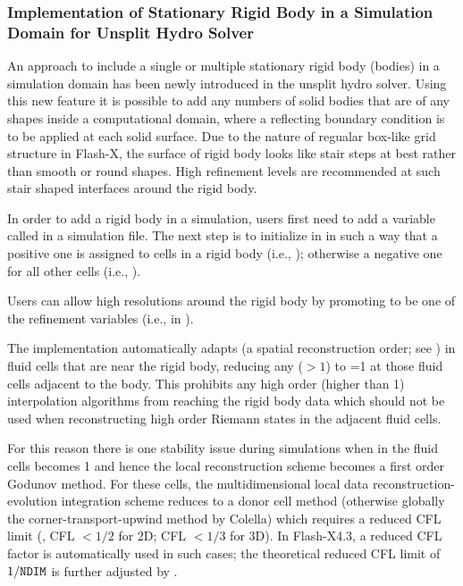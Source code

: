\subsubsection{Implementation of Stationary Rigid Body in a Simulation Domain for Unsplit Hydro Solver}
\label{Sec:StationaryRigidBody}
An approach to include a single or multiple stationary rigid body (bodies) in a simulation domain has 
been newly introduced in the unsplit hydro solver. Using this new feature it is possible to add any 
numbers of solid bodies that are of any shapes inside a computational domain, where a reflecting 
boundary condition is to be applied at each solid surface. Due to the nature of regualar box-like 
grid structure in Flash-X, the surface of rigid body looks like stair steps at best rather than smooth 
or round shapes. High refinement levels are recommended at such stair shaped interfaces around the rigid body. 

In order to add a rigid body in a simulation, users first need to add a variable called  
in a simulation  file. The next step is to initialize  in  
in such a way that a positive one is assigned to cells in a rigid body (i.e.,  ); 
otherwise a negative one for all other cells (i.e., ).

Users can allow high resolutions around the rigid body by promoting  to be one of the refinement variables (i.e.,
 in ).

The implementation automatically adapts  (a spatial reconstruction order; see ) in fluid cells 
that are near the rigid body, reducing
any  ($> 1$) to =1 at those fluid cells adjacent to the body. This prohibits any high order 
(higher than 1) interpolation algorithms from reaching the rigid body data which should not be used 
when reconstructing high order Riemann states in the adjacent fluid cells.
 
For this reason there is one stability issue during simulations when  in the fluid cells 
becomes 1 and hence the local reconstruction scheme becomes a first order Godunov method. For these cells, 
the multidimensional local data reconstruction-evolution integration scheme reduces to a donor cell method 
(otherwise globally the corner-transport-upwind method by Colella) which requires a reduced CFL limit 
(\ie, CFL $<1/2$ for 2D; CFL $< 1/3$ for 3D).
In Flash-X4.3, a reduced CFL factor is automatically used in such cases; the theoretical reduced CFL limit of $1/{\tt NDIM}$
is further adjusted by .

